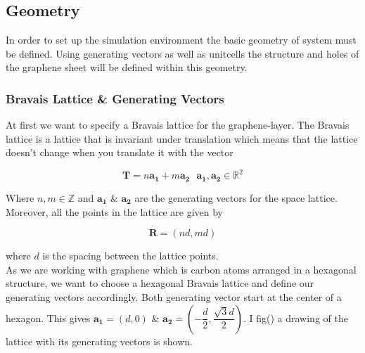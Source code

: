 \subsection{Geometry}

In order to set up the simulation environment the basic geometry of system must be defined. Using generating vectors as well as unitcells the structure and holes of the graphene sheet will be defined within this geometry. 

\subsubsection{Bravais Lattice \& Generating Vectors}
At first we want to specify a Bravais lattice for the graphene-layer. The Bravais lattice is a lattice that is invariant under translation which means that the lattice doesn't change when you translate it with the vector 

\begin{equation}
    \mathbf{T}=n\mathbf{a_{1}}+m\mathbf{a_{2}}\ \ \ \mathbf{a_{1}},\mathbf{a_{2}} \in \mathbb{R}^{2} 
\end{equation}

Where $n,m \in \mathbb{Z}$ and $\mathbf{a_{1}}$ \& $\mathbf{a_{2}}$ are the generating vectors for the space lattice. Moreover, all the points in the lattice are given by 

\begin{equation}
    \mathbf{R}=(nd,md) 
\end{equation}

where $d$ is the spacing between the lattice points. \\
As we are working with graphene which is carbon atoms arranged in a hexagonal structure, we want to choose a hexagonal Bravais lattice and define our generating vectors accordingly. Both generating vector start at the center of a hexagon. This gives $\mathbf{a_{1}}=(d,0)$ \& $\mathbf{a_{2}}=\left(-\dfrac{d}{2},\dfrac{\sqrt{3}d}{2}\right)$. I fig(\figref) a drawing of the lattice with its generating vectors is shown. 
